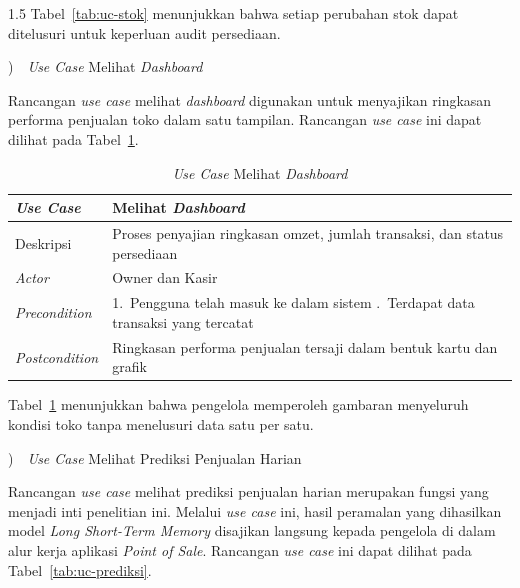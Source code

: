 \documentclass[12pt, a4paper, onecolumn, oneside]{report}
\begin{document}
\begin{spacing}{1.5}
Tabel~\ref{tab:uc-stok} menunjukkan bahwa setiap perubahan stok dapat ditelusuri untuk keperluan audit persediaan.

)~~\textit{Use Case} Melihat \textit{Dashboard}

Rancangan \textit{use case} melihat \textit{dashboard} digunakan untuk menyajikan ringkasan performa penjualan toko dalam satu tampilan. Rancangan \textit{use case} ini dapat dilihat pada Tabel~\ref{tab:uc-dashboard}.

\begin{table}[H]
\centering
\caption{\textit{Use Case} Melihat \textit{Dashboard}}
\label{tab:uc-dashboard}
\begin{tabularx}{\textwidth}{|p{3.2cm}|X|}
\hline
\textbf{\textit{Use Case}} & \textbf{Melihat \textit{Dashboard}} \\ \hline
Deskripsi & Proses penyajian ringkasan omzet, jumlah transaksi, dan status persediaan \\ \hline
\textit{Actor} & Owner dan Kasir \\ \hline
\textit{Precondition} & 1.~Pengguna telah masuk ke dalam sistem \newline 2.~Terdapat data transaksi yang tercatat \\ \hline
\textit{Postcondition} & Ringkasan performa penjualan tersaji dalam bentuk kartu dan grafik \\ \hline
\end{tabularx}
\end{table}

Tabel~\ref{tab:uc-dashboard} menunjukkan bahwa pengelola memperoleh gambaran menyeluruh kondisi toko tanpa menelusuri data satu per satu.

)~~\textit{Use Case} Melihat Prediksi Penjualan Harian

Rancangan \textit{use case} melihat prediksi penjualan harian merupakan fungsi yang menjadi inti penelitian ini. Melalui \textit{use case} ini, hasil peramalan yang dihasilkan model \textit{Long Short-Term Memory} disajikan langsung kepada pengelola di dalam alur kerja aplikasi \textit{Point of Sale}. Rancangan \textit{use case} ini dapat dilihat pada Tabel~\ref{tab:uc-prediksi}.


\end{spacing}
\end{document}
